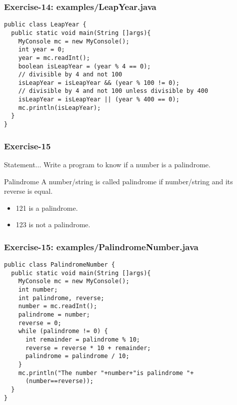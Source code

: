 \documentclass[xcolor=dvipsnames,dvip,notes=show,table]{beamer}
\begin{document}
\begin{frame}[fragile]
\frametitle{Exercise-14: examples/LeapYear.java}
\scriptsize
\begin{lstlisting}
public class LeapYear {
  public static void main(String []args){
    MyConsole mc = new MyConsole();
    int year = 0;
    year = mc.readInt();
    boolean isLeapYear = (year % 4 == 0);
    // divisible by 4 and not 100
    isLeapYear = isLeapYear && (year % 100 != 0);
    // divisible by 4 and not 100 unless divisible by 400
    isLeapYear = isLeapYear || (year % 400 == 0);
    mc.println(isLeapYear);	
  }
}
\end{lstlisting}
\end{frame}



\begin{frame}[fragile]
\frametitle{Exercise-15}
\begin{block}{Statement...}
 Write a program to know if a number is a palindrome.
\end{block}

\begin{exampleblock}{Palindrome}
  A number/string is called palindrome if number/string and its reverse is equal.
  \begin{itemize}
   \item 121 is a palindrome.
   \item 123 is not a palindrome.
  \end{itemize}

\end{exampleblock}


\end{frame}


\begin{frame}[fragile]
\frametitle{Exercise-15: examples/PalindromeNumber.java}
\scriptsize
\begin{lstlisting}
public class PalindromeNumber {
  public static void main(String []args){
    MyConsole mc = new MyConsole();
    int number;
    int palindrome, reverse;
    number = mc.readInt();
    palindrome = number;
    reverse = 0;
    while (palindrome != 0) {
      int remainder = palindrome % 10;
      reverse = reverse * 10 + remainder;
      palindrome = palindrome / 10;
    }
    mc.println("The number "+number+"is palindrome "+ 
      (number==reverse));
  }
}
\end{lstlisting}
\end{frame}
\end{document}
